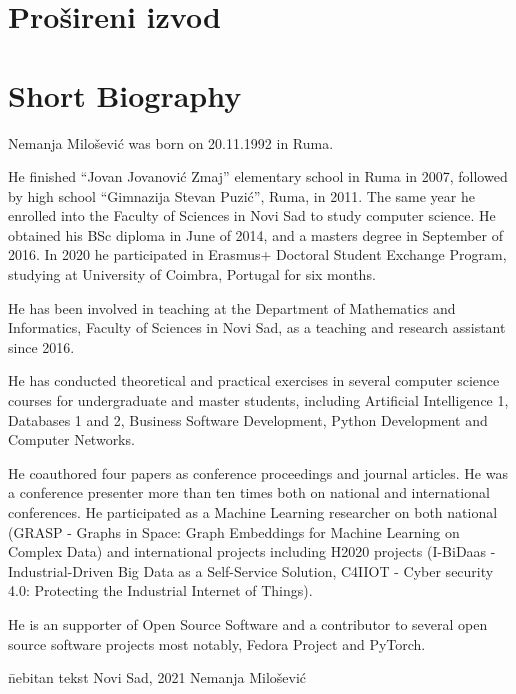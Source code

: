 \documentclass[b5paper]{book}
\begin{document}
\chapter{Prošireni izvod}




\chapter{Short Biography}


Nemanja Milošević was born on 20.11.1992 in Ruma.

He finished ``Jovan Jovanović Zmaj'' elementary school in Ruma in 2007,
followed by high school ``Gimnazija Stevan Puzić'', Ruma, in 2011. The same year he enrolled into the Faculty of Sciences in Novi Sad to study computer science. He obtained his BSc diploma in June of 2014, and a masters degree in September of 2016. In 2020 he participated in Erasmus+ Doctoral Student Exchange Program, studying at University of Coimbra, Portugal for six months.

He has been involved in teaching at the Department of Mathematics and
Informatics, Faculty of Sciences in Novi Sad, as a teaching and research assistant since 2016.

He has conducted theoretical and practical exercises in several
computer science courses for undergraduate and master students,
including Artificial Intelligence 1, Databases 1 and 2, Business Software Development, Python Development and Computer Networks.

He coauthored four papers as conference proceedings and
journal articles. He was a conference presenter more than ten times both on national and international conferences. He participated as a Machine Learning researcher on both national (GRASP - Graphs in Space: Graph Embeddings for Machine Learning on Complex Data) and international projects including H2020 projects (I-BiDaas - Industrial-Driven Big Data as a Self-Service Solution, C4IIOT - Cyber security 4.0: Protecting the Industrial Internet of Things).

He is an supporter of Open Source Software and a contributor to several open source software projects most notably, Fedora Project and PyTorch.

\vfill


\begin{tabbing}
  \hspace{0.7\textwidth} \= nebitan tekst \kill
  Novi Sad, 2021 \> Nemanja Milošević
\end{tabbing}
\end{document}
